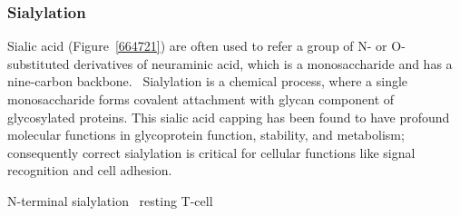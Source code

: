 \subsubsection {Sialylation}
Sialic acid (Figure~\ref{664721}) are often used to refer a group of N- or O-substituted derivatives of neuraminic acid, which is a monosaccharide and has a nine-carbon backbone.~\cite{Vocadlo_2009} Sialylation is a chemical process, where a single monosaccharide forms covalent attachment with glycan component of glycosylated proteins. This sialic acid capping has been found to have profound molecular functions in glycoprotein function, stability, and metabolism; consequently correct sialylation is critical for cellular functions like signal recognition and cell adhesion.~\cite{Bhide_2016}
\par 
N-terminal sialylation~\cite{Stehling_1999}
resting T-cell~\cite{K_hne_1996} 